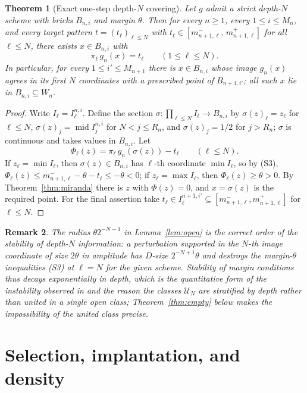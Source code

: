 \documentclass[11pt]{article}
\newtheorem{theorem}{Theorem}[section]
\newtheorem{remark}[theorem]{Remark}
\begin{document}
\begin{theorem}[Exact one-step depth-$N$ covering]\label{thm:covering}
Let $g$ admit a strict depth-$N$ scheme with bricks $B_{n,i}$ and margin $\theta$.
Then for every $n\ge1$, every $1\le i\le M_n$, and every target pattern
$t=(t_\ell)_{\ell\le N}$ with
$t_\ell\in[m^-_{n+1,\ell},\,m^+_{n+1,\ell}]$ for all $\ell\le N$,
there exists $x\in B_{n,i}$ with
\[
\pi_\ell\,g_n(x)=t_\ell\qquad(1\le\ell\le N).
\]
In particular, for every $1\le i'\le M_{n+1}$ there is $x\in B_{n,i}$ whose image
$g_n(x)$ agrees in its first $N$ coordinates with a prescribed point of $B_{n+1,i'}$;
all such $x$ lie in $B_{n,i}\subseteq W_n$.
\end{theorem}

\begin{proof}
Write $I_\ell=I^{n,i}_\ell$.  Define the section
$\sigma:\prod_{\ell\le N}I_\ell\to B_{n,i}$ by
$\sigma(z)_\ell=z_\ell$ for $\ell\le N$, $\sigma(z)_j=\operatorname{mid}I^{n,i}_j$ for
$N<j\le R_n$, and $\sigma(z)_j=1/2$ for $j>R_n$; $\sigma$ is continuous and takes
values in $B_{n,i}$.  Let
\[
\Phi_\ell(z)=\pi_\ell\,g_n(\sigma(z))-t_\ell\qquad(\ell\le N).
\]
If $z_\ell=\min I_\ell$, then $\sigma(z)\in B_{n,i}$ has $\ell$-th coordinate
$\min I_\ell$, so by (S3),
$\Phi_\ell(z)\le m^-_{n+1,\ell}-\theta-t_\ell\le-\theta<0$; if
$z_\ell=\max I_\ell$, then $\Phi_\ell(z)\ge\theta>0$.  By
Theorem~\ref{thm:miranda} there is $z$ with $\Phi(z)=0$, and $x=\sigma(z)$ is the
required point.  For the final assertion take
$t_\ell\in I^{n+1,i'}_\ell\subseteq[m^-_{n+1,\ell},m^+_{n+1,\ell}]$ for $\ell\le N$.
\end{proof}

\begin{remark}\label{rem:depth-cost}
The radius $\theta2^{-N-1}$ in Lemma~\ref{lem:open} is the correct order of the
stability of depth-$N$ information: a perturbation supported in the $N$-th image
coordinate of size $2\theta$ in amplitude has $D$-size $2^{-N+1}\theta$ and destroys
the margin-$\theta$ inequalities (S3) at $\ell=N$ for the given scheme.  Stability of
margin conditions thus decays exponentially in depth, which is the quantitative form
of the instability observed in \cite[Section~14]{Shmalo2026} and the reason the
classes $\mathcal U_N$ are stratified by depth rather than united in a single open
class; Theorem~\ref{thm:empty} below makes the impossibility of the united class
precise.
\end{remark}

\section{Selection, implantation, and density}\label{sec:density}
\end{document}
